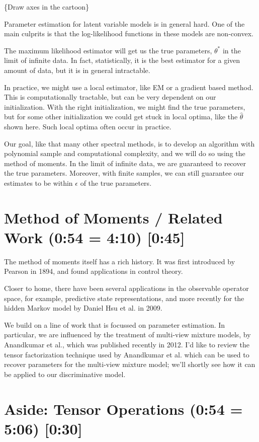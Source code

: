 \documentclass[tablecaption=bottom]{jmlr}
\begin{document}
\{Draw axes in the cartoon\}

Parameter estimation for latent variable models is in general hard. One
of the main culprits is that the log-likelihood functions in these
models are non-convex.

The maximum likelihood estimator will get us the true parameters,
$\theta^*$ in the limit of infinite data. In fact, statistically, it is
the best estimator for a given amount of data, but it is in general
intractable.

In practice, we might use a local estimator, like EM or a gradient based
method. This is computationally tractable, but can be very dependent on
our initialization. With the right initialization, we might find the
true parameters, but for some other initialization we could get stuck in
local optima, like the $\hat \theta$ shown here. Such local optima often
occur in practice.

Our goal, like that many other spectral methods, is to develop an
algorithm with polynomial sample and computational complexity, and we
will do so using the method of moments. In the limit of infinite data,
we are guaranteed to recover the true parameters. Moreover, with finite
samples, we can still guarantee our estimates to be within $\epsilon$ of
the true parameters.

\section{Method of Moments / Related Work (0:54 = 4:10) {[}0:45{]}}

The method of moments itself has a rich history. It was first introduced
by Pearson in 1894, and found applications in control theory.

Closer to home, there have been several applications in the observable
operator space, for example, predictive state representations, and more
recently for the hidden Markov model by Daniel Hsu et al. in 2009.

We build on a line of work that is focussed on parameter estimation. In
particular, we are influenced by the treatment of multi-view mixture
models, by Anandkumar et al., which was published recently in 2012. I'd
like to review the tensor factorization technique used by Anandkumar et
al. which can be used to recover parameters for the multi-view mixture
model; we'll shortly see how it can be applied to our discriminative
model.

\section{Aside: Tensor Operations (0:54 = 5:06) {[}0:30{]}}
\end{document}

